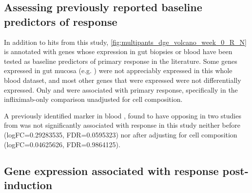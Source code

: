 \begin{outline}
\subsection{Assessing previously reported baseline predictors of response}

In addition to hits from this study, \autoref{fig:multipants_dge_volcano_week_0_R_N} is annotated with genes whose expression in gut biopsies or blood have been tested as baseline predictors of primary response in the literature\autocite{arijs2009MucosalGeneSignatures,arijs2010PredictiveValueEpithelial,verstockt2019LowTREM1Expression,salvador-martin2020GeneSignaturesEarly}.
Some genes expressed in gut mucosa (e.g. ) were not appreciably expressed in this whole blood dataset, 
and most other genes that were expressed were not differentially expressed.
Only  and  were associated with primary response, specifically in the infliximab-only comparison unadjusted for cell composition.

A previously identified marker in blood , found to have opposing in two studies from \autocite{gaujoux2019CellcentredMetaanalysisReveals,verstockt2019LowTREM1Expression}
was not significantly associated with response in this study neither
before (logFC=\num{0.29283535}, FDR=\num{0.0595323})
nor after adjusting for cell composition (logFC=\num{0.04625626}, FDR=\num{0.9864125}).




\subsection{Gene expression associated with response post-induction}


\end{outline}
